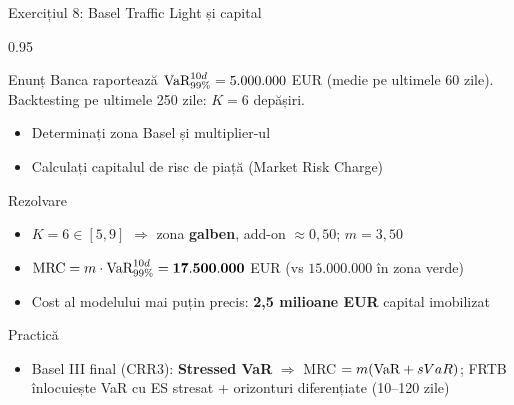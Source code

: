 \documentclass[9pt, aspectratio=169, t]{beamer}
\begin{document}
\begin{frame}[shrink=10]{Exercițiul 8: Basel Traffic Light și capital}
    \begin{cminipage}{0.95\textwidth}
    \begin{block}{Enunț}
    Banca raportează $\text{VaR}^{10d}_{99\%} = 5.000.000$ EUR (medie pe ultimele 60 zile). Backtesting pe ultimele 250 zile: $K = 6$ depășiri.
    \begin{itemize}\setlength{\itemsep}{0pt}
        \item Determinați zona Basel și multiplier-ul
        \item Calculați capitalul de risc de piață (Market Risk Charge)
    \end{itemize}
    \end{block}
    \vspace{0.1cm}
    \begin{exampleblock}{Rezolvare}
    \begin{itemize}\setlength{\itemsep}{0pt}
        \item $K = 6 \in [5, 9]$ $\Rightarrow$ zona \textcolor{Amber}{\textbf{galben}}, add-on $\approx 0{,}50$; $m = 3{,}50$
        \item $\text{MRC} = m \cdot \text{VaR}^{10d}_{99\%} = \mathbf{17.500.000}$ EUR (vs $15.000.000$ în zona verde)
        \item Cost al modelului mai puțin precis: \textbf{2{,}5 milioane EUR} capital imobilizat
    \end{itemize}
    \end{exampleblock}
    \begin{alertblock}{Practică}
    \begin{itemize}\setlength{\itemsep}{0pt}
        \item Basel III final (CRR3): \textbf{Stressed VaR} $\Rightarrow$ MRC $= m(\text{VaR} + sVaR)$; FRTB înlocuiește VaR cu ES stresat + orizonturi diferențiate (10--120 zile)
    \end{itemize}
    \end{alertblock}
    \end{cminipage}
\end{frame}
\end{document}
